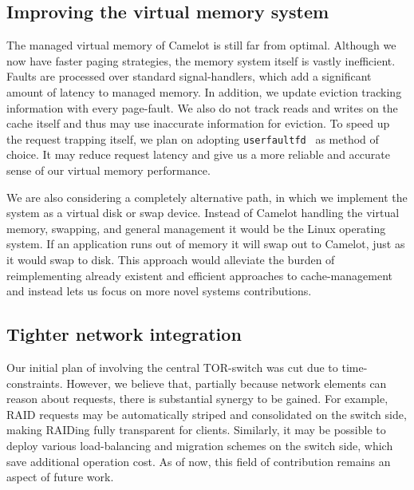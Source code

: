 \subsection{Improving the virtual memory system}
The managed virtual memory of Camelot is still far from optimal. Although we now have faster paging strategies, the memory system itself is vastly inefficient. Faults are processed over standard signal-handlers, which add a significant amount of latency to managed memory. In addition, we update eviction tracking information with every page-fault. We also do not track reads and writes on the cache itself and thus may use inaccurate information for eviction.
To speed up the request trapping itself, we plan on adopting \texttt{userfaultfd}~\cite{userfaultfd} as method of choice. It may reduce request latency and give us a more reliable and accurate sense of our virtual memory performance.

We are also considering a completely alternative path, in which we implement the system as a virtual disk or swap device. Instead of Camelot handling the virtual memory, swapping, and general management it would be the Linux operating system. If an application runs out of memory it will swap out to Camelot, just as it would swap to disk. This approach would alleviate the burden of reimplementing already existent and efficient approaches to cache-management and instead lets us focus on more novel systems contributions.

\subsection{Tighter network integration}
Our initial plan of involving the central TOR-switch was cut due to time-constraints. However, we believe that, partially because network elements can reason about requests, there is substantial synergy to be gained. For example, RAID requests may be automatically striped and consolidated on the switch side, making RAIDing fully transparent for clients. Similarly, it may be possible to deploy various load-balancing and migration schemes on the switch side, which save additional operation cost. 
As of now, this field of contribution remains an aspect of future work.



\label{sec:future}
